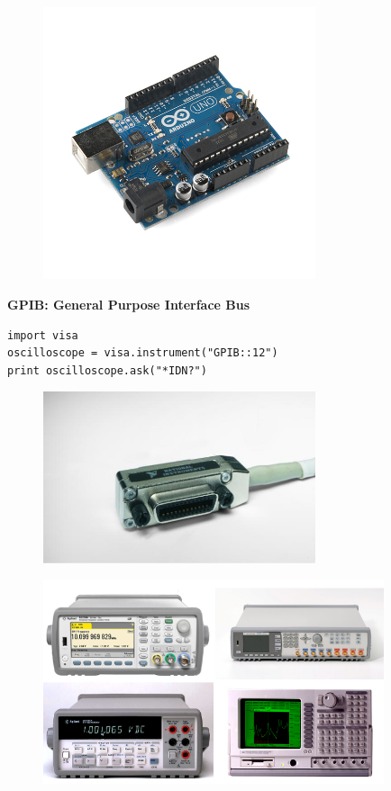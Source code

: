 \documentclass{beamer}
\begin{document}
\begin{frame}

\begin{figure}[ht]
	\includegraphics[width=8cm]{arduino.jpg}
\end{figure}

\end{frame}

\begin{frame}[fragile]

\textbf{GPIB: General Purpose Interface Bus}

\begin{verbatim}
import visa
oscilloscope = visa.instrument("GPIB::12")
print oscilloscope.ask("*IDN?")
\end{verbatim}

\begin{figure}[ht]
	\includegraphics[width=8cm]{gpib1.JPG}
\end{figure}

\end{frame}

\begin{frame}

\begin{figure}[ht]
	\includegraphics[width=10cm]{instruments.png}
\end{figure}

\end{frame}
\end{document}
